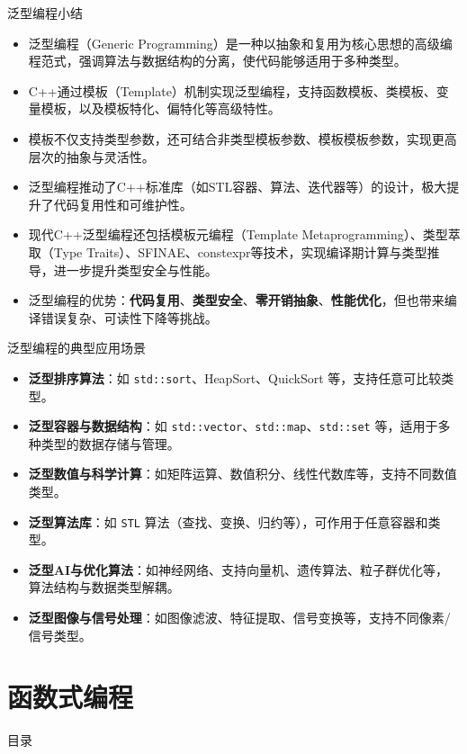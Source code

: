 \documentclass[UTF8,aspectratio=169]{beamer}
\begin{document}
\begin{frame}{泛型编程小结}
    \begin{itemize}
        \item 泛型编程（Generic Programming）是一种以抽象和复用为核心思想的高级编程范式，强调算法与数据结构的分离，使代码能够适用于多种类型。
        \item C++通过模板（Template）机制实现泛型编程，支持函数模板、类模板、变量模板，以及模板特化、偏特化等高级特性。
        \item 模板不仅支持类型参数，还可结合非类型模板参数、模板模板参数，实现更高层次的抽象与灵活性。
        \item 泛型编程推动了C++标准库（如STL容器、算法、迭代器等）的设计，极大提升了代码复用性和可维护性。
        \item 现代C++泛型编程还包括模板元编程（Template Metaprogramming）、类型萃取（Type Traits）、SFINAE、constexpr等技术，实现编译期计算与类型推导，进一步提升类型安全与性能。
        \item 泛型编程的优势：\textbf{代码复用}、\textbf{类型安全}、\textbf{零开销抽象}、\textbf{性能优化}，但也带来编译错误复杂、可读性下降等挑战。
    \end{itemize}
\end{frame}

\begin{frame}{泛型编程的典型应用场景}
    \begin{itemize}
        \item \textbf{泛型排序算法}：如 \texttt{std::sort}、HeapSort、QuickSort 等，支持任意可比较类型。
        \item \textbf{泛型容器与数据结构}：如 \texttt{std::vector}、\texttt{std::map}、\texttt{std::set} 等，适用于多种类型的数据存储与管理。
        \item \textbf{泛型数值与科学计算}：如矩阵运算、数值积分、线性代数库等，支持不同数值类型。
        \item \textbf{泛型算法库}：如 \texttt{STL} 算法（查找、变换、归约等），可作用于任意容器和类型。
        \item \textbf{泛型AI与优化算法}：如神经网络、支持向量机、遗传算法、粒子群优化等，算法结构与数据类型解耦。
        \item \textbf{泛型图像与信号处理}：如图像滤波、特征提取、信号变换等，支持不同像素/信号类型。
    \end{itemize}
\end{frame}

\section{函数式编程}
\begin{frame}{目录}
    \begin{multicols}{2}
        \tableofcontents[currentsection]
    \end{multicols}
\end{frame}
\end{document}
